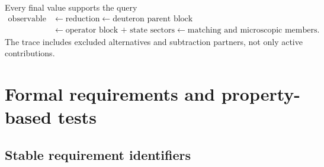 \documentclass[11pt]{article}
\begin{document}
Every final value supports the query
\begin{equation}
\begin{aligned}
 \text{observable}
 &\longleftarrow \text{reduction}
 \longleftarrow \text{deuteron parent block}\\
 &\longleftarrow \text{operator block + state sectors}
 \longleftarrow \text{matching and microscopic members}.
\end{aligned}
\label{eq:nuclear-ancestry-query}
\end{equation}
The trace includes excluded alternatives and subtraction partners, not only
active contributions.

\section{Formal requirements and property-based tests}
\label{sec:requirements-tests}

\subsection{Stable requirement identifiers}
\end{document}
